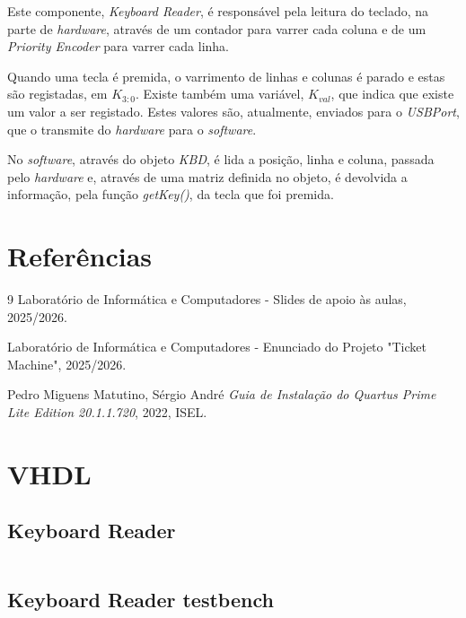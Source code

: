 \documentclass[10pt,a4paper,twocolumn]{article}
\begin{document}
\noindent \par Este componente, \textit{Keyboard Reader}, é responsável pela leitura do teclado, na parte de \textit{hardware},
através de um contador para varrer cada coluna e de um \textit{Priority Encoder} para varrer cada linha.

Quando uma tecla é premida, o varrimento de linhas e colunas é parado e estas são registadas, em $K_{3:0}$.
Existe também uma variável, $K_{val}$, que indica que existe um valor a ser registado. Estes valores são, 
atualmente, enviados para o \textit{USBPort}, que o transmite do \textit{hardware} para o \textit{software}.

No \textit{software}, através do objeto \textit{KBD}, é lida a posição, linha e coluna, passada pelo
\textit{hardware} e, através de uma matriz definida no objeto, é devolvida a informação, pela função
\textit{getKey()}, da tecla que foi premida.

\onecolumn
\newpage
\section*{Referências}
\begin{thebibliography}{9}
Laboratório de Informática e Computadores - Slides de apoio às aulas, 2025/2026.

Laboratório de Informática e Computadores - Enunciado do Projeto "Ticket Machine", 2025/2026.

Pedro Miguens Matutino, Sérgio André \emph{Guia de Instalação do Quartus Prime Lite Edition 20.1.1.720}, 2022, ISEL.
\end{thebibliography}

\clearpage
\appendix
\section{VHDL}

\subsection{Keyboard Reader}
\label{sec:KbdReader_VHDL}
\begin{minipage}[H]{\linewidth}
\footnotesize
\inputminted{vhdl}{vhdl/keyboardReader.vhd}
\label{vhdl:KbdReader}
\end{minipage}

\subsection{Keyboard Reader testbench}
\label{sec:KbdReader_tb_VHDL}
\begin{minipage}{\linewidth}
\footnotesize
\inputminted{vhdl}{vhdl/keyboardReader_tb.vhd}
\label{vhdl:KbdReader_tb}
\end{minipage}
\end{document}
